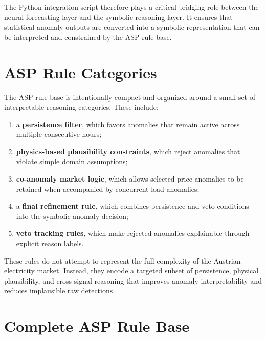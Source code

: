 The Python integration script therefore plays a critical bridging role between the neural forecasting layer and the symbolic reasoning layer. It ensures that statistical anomaly outputs are converted into a symbolic representation that can be interpreted and constrained by the ASP rule base.

\section{ASP Rule Categories}

The ASP rule base is intentionally compact and organized around a small set of interpretable reasoning categories. These include:
\begin{enumerate}
	\item a \textbf{persistence filter}, which favors anomalies that remain active across multiple consecutive hours;
	\item \textbf{physics-based plausibility constraints}, which reject anomalies that violate simple domain assumptions;
	\item \textbf{co-anomaly market logic}, which allows selected price anomalies to be retained when accompanied by concurrent load anomalies;
	\item a \textbf{final refinement rule}, which combines persistence and veto conditions into the symbolic anomaly decision;
	\item \textbf{veto tracking rules}, which make rejected anomalies explainable through explicit reason labels.
\end{enumerate}

These rules do not attempt to represent the full complexity of the Austrian electricity market. Instead, they encode a targeted subset of persistence, physical plausibility, and cross-signal reasoning that improves anomaly interpretability and reduces implausible raw detections.

\section{Complete ASP Rule Base}


